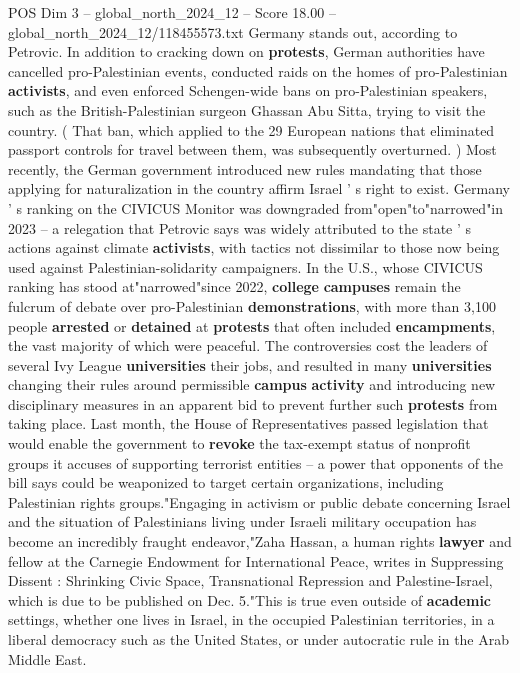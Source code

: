 \begin{textsample}{POS Dim 3 – global\_north\_2024\_12 – Score 18.00 – global\_north\_2024\_12/118455573.txt}
Germany stands out, according to Petrovic.
In addition to cracking down on \textbf{protests}, German authorities have cancelled pro-Palestinian events, conducted raids on the homes of pro-Palestinian \textbf{activists}, and even enforced Schengen-wide bans on pro-Palestinian speakers, such as the British-Palestinian surgeon Ghassan Abu Sitta, trying to visit the country. ( That ban, which applied to the 29 European nations that eliminated passport controls for travel between them, was subsequently overturned. ) Most recently, the German government introduced new rules mandating that those applying for naturalization in the country affirm Israel ' s right to exist.
Germany ' s ranking on the CIVICUS Monitor was downgraded from"open"to"narrowed"in 2023 -- a relegation that Petrovic says was widely attributed to the state ' s actions against climate \textbf{activists}, with tactics not dissimilar to those now being used against Palestinian-solidarity campaigners.
In the U.S., whose CIVICUS ranking has stood at"narrowed"since 2022, \textbf{college} \textbf{campuses} remain the fulcrum of debate over pro-Palestinian \textbf{demonstrations}, with more than 3,100 people \textbf{arrested} or \textbf{detained} at \textbf{protests} that often included \textbf{encampments}, the vast majority of which were peaceful.
The controversies cost the leaders of several Ivy League \textbf{universities} their jobs, and resulted in many \textbf{universities} changing their rules around permissible \textbf{campus} \textbf{activity} and introducing new disciplinary measures in an apparent bid to prevent further such \textbf{protests} from taking place.
Last month, the House of Representatives passed legislation that would enable the government to \textbf{revoke} the tax-exempt status of nonprofit groups it accuses of supporting terrorist entities -- a power that opponents of the bill says could be weaponized to target certain organizations, including Palestinian rights groups."Engaging in activism or public debate concerning Israel and the situation of Palestinians living under Israeli military occupation has become an incredibly fraught endeavor,"Zaha Hassan, a human rights \textbf{lawyer} and fellow at the Carnegie Endowment for International Peace, writes in Suppressing Dissent : Shrinking Civic Space, Transnational Repression and Palestine-Israel, which is due to be published on Dec. 5."This is true even outside of \textbf{academic} settings, whether one lives in Israel, in the occupied Palestinian territories, in a liberal democracy such as the United States, or under autocratic rule in the Arab Middle East.

\end{textsample}
